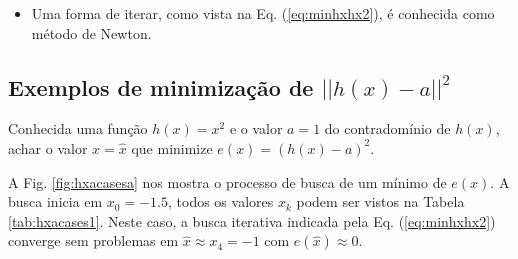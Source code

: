 \begin{tcbattention}
\begin{itemize}
\item Uma forma de iterar, como vista na Eq. (\ref{eq:minhxhx2}), é conhecida como método de Newton.
\end{itemize}
\end{tcbattention}


\subsection{Exemplos de minimização de $||h(x)-a||^2$}


\begin{example}\label{ex:minhxhx1}
Conhecida uma função $h(x)=x^2$ e o valor $a=1$ do contradomínio de $h(x)$,
achar o valor $x=\hat{x}$ que minimize $e(x)=(h(x)-a)^2$.
\end{example}
\begin{SolutionT}\label{sol:minhxhx1}
 A Fig. \ref{fig:hxacasesa} nos mostra o processo de busca de um mínimo de $e(x)$. 
A busca inicia em $x_0=-1.5$, 
todos os valores $x_{k}$ podem ser vistos na
Tabela \ref{tab:hxacases1}. 
Neste caso, a busca iterativa indicada pela Eq. (\ref{eq:minhxhx2}) 
converge sem problemas em $\hat{x}\approx x_4=-1$ com $e(\hat{x})\approx 0$.
\end{SolutionT}

